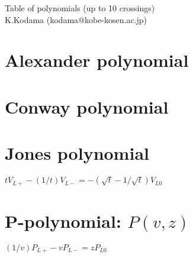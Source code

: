 %
% 


\newlength{\pageheight}
\newlength{\pagewidth}

\def\resetsize{
	\setlength{\textheight}{\pageheight}
	\addtolength{\textheight}{-2in}
	\addtolength{\textheight}{-2\topmargin}
	\addtolength{\textheight}{-\headheight}
	\addtolength{\textheight}{-\headsep}
	\addtolength{\textheight}{-\footskip}
	\setlength{\textwidth}{\pagewidth}
	\addtolength{\textwidth}{-2in}
	\addtolength{\textwidth}{-2\oddsidemargin}
}

\def\paperAfour{
\setlength{\pagewidth}{210mm}
\setlength{\pageheight}{297mm}
	\topmargin 0pt
	\headheight 0pt %
	\headsep 0mm %
	\footskip 0pt
	\oddsidemargin 0pt
	\evensidemargin 0pt
\resetsize
}


\paperAfour
\setlength{\parindent}{0pt}



Table of polynomials (up to 10 crossings) \\
{K.Kodama (kodama@kobe-kosen.ac.jp)\\}

\tableofcontents


\section{Alexander polynomial}

\newpage


\section{Conway polynomial}

\newpage


\section{Jones polynomial}
$t V_{L+}-(1/t)V_{L-} = -(\sqrt{t}-1/\sqrt{t})V_{L0}$ \par

\newpage


\section{P-polynomial: $P(v,z)$}
 $(1/v)P_{L+} -v P_{L-} = z P_{L0}$ \par

\newpage


